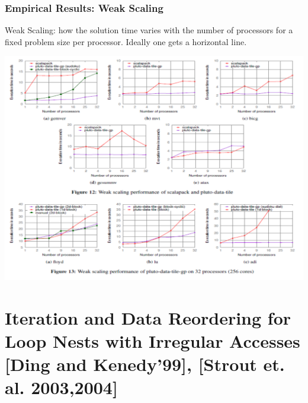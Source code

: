 \documentclass{beamer}
\newcommand{\emp}[1]{\textcolor{DikuRed}{ #1}}
\begin{document}
\begin{frame}[fragile,t]
  \frametitle{Empirical Results: Weak Scaling}

\begin{scriptsize}
\emp{Weak Scaling}: how the solution time varies with the 
            number of processors for a fixed problem size per processor.
            Ideally one gets a horizontal line.
\end{scriptsize}



\includegraphics[width=59ex]{Figures/WeakScaling}

\end{frame}


\section{Iteration and Data Reordering for Loop Nests with Irregular Accesses [Ding and Kenedy'99], [Strout et. al. 2003,2004]}

\begin{frame}[fragile]
	\tableofcontents[currentsection]
\end{frame}
\end{document}
